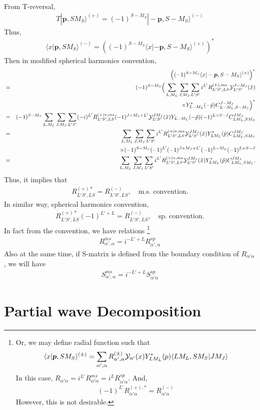 \documentclass[10pt]{book}
\def\bm{\boldsymbol}
\newcommand{\bea}{\begin{eqnarray}}
\newcommand{\eea}{\end{eqnarray}}
\newcommand{\no}{\nonumber \\}
\def\vp{{\bm p}}
\def\la{\langle}
\def\ra{\rangle}
\begin{document}
From T-reversal,
\bea 
T|\vp,SM_S\ra^{(+)}=(-1)^{S-M_S}|-\vp,S-M_S\ra^{(-)}
\eea 
Thus,
\bea 
\la x|\vp,S M_S\ra^{(-)}=\left((-1)^{S-M_S}\la x|-\vp,S -M_S\ra^{(+)}\right)^*
\eea 
Then in modified spherical harmonics convention,
\bea 
& &\left((-1)^{S-M_S}\la x|-\vp,S -M_S\ra^{(+)}\right)^* \no 
&=&(-1)^{S-M_S}\Big( 
    \sum_{L,M_L}\sum_{J,M_J}\sum_{L'S'} i^{L'} 
       R^{(+),ms}_{L'S',LS} {\cal Y}_{L'S'}^{J -M_J} (\hat{x})
       \no & &\times   Y_{L -M_L}^*(-\hat{p})
       C_{L -M_L,S -M_S}^{J -M_J}
                         \Big)^*    \no 
&=& (-1)^{S-M_S}\sum_{L,M_L}\sum_{J,M_J}\sum_{L'S'} (-i)^{L'}
       R^{(+)*,ms}_{L'S',LS}(-1)^{J+M_J+L'}{\cal Y}_{L'S'}^{J M_J} (\hat{x})
       Y_{L -M_L}(-\hat{p}) (-1)^{L+S-J} C_{L M_L,S M_S}^{J M_J}\no 
&=& \sum_{L,M_L}\sum_{J,M_J}\sum_{L'S'}  i^{L'}  R^{(+)*,ms}_{L'S',LS}{\cal Y}_{L'S'}^{J M_J} (\hat{x})
      Y^*_{L M_L}(\hat{p}) C_{L M_L,S M_S}^{J M_J} \no & &\times 
    (-1)^{S-M_S}(-1)^{L'} (-1)^{J+M_J+L'}(-1)^{L-M_L}(-1)^{L+S-J} \no 
&=& \sum_{L,M_L}\sum_{J,M_J}\sum_{L'S'}  i^{L'}  R^{(+)*,ms}_{L'S',LS}{\cal Y}_{L'S'}^{J M_J} (\hat{x})
      Y^*_{L M_L}(\hat{p}) C_{L M_L,S M_S}^{J M_J}.    
\eea 
Thus, it implies that 
\bea 
R_{L'S',LS}^{(+)*}=R_{L'S',LS}^{(-)},\quad \mbox{m.s. convention.}
\eea 
In similar way, spherical harmonics convention,
\bea 
R_{L'S',LS}^{(+)*}(-1)^{L'+L}=R_{L'S',LS}^{(-)},\quad \mbox{sp. convention.}
\eea 
In fact from the convention, we have relations
\footnote{ 
Or, we may define radial function such that
\bea 
\la x|\vp, S M_S\ra^{(\pm)}=\sum_{\alpha',\alpha} R^{(\pm)}_{\alpha',\alpha} 
              {\cal Y}_{\alpha'}(x) Y^*_{LM_L}(p) \la L M_L, S M_S|J M_J\ra
\eea 
In this case, $R_{\alpha'\alpha}=i^{L'}R^{ms}_{\alpha'\alpha}=i^L R^{sp}_{\alpha'\alpha}$.
And,
\bea 
(-1)^{L'}R^{(+),*}_{\alpha'\alpha}=R^{(-)}_{\alpha'\alpha}
\eea 
However, this is not desirable. 
}
\bea 
R_{\alpha',\alpha}^{ms}=i^{-L'+L} R_{\alpha',\alpha}^{sp}
\eea 
Also at the same time, if S-matrix is defined from the 
boundary condition of $R_{\alpha'\alpha}$,
we will have
\bea 
S_{\alpha',\alpha}^{ms}=i^{-L'+L} S_{\alpha'\alpha}^{sp}
\eea 


\section{Partial wave Decomposition}
\end{document}
